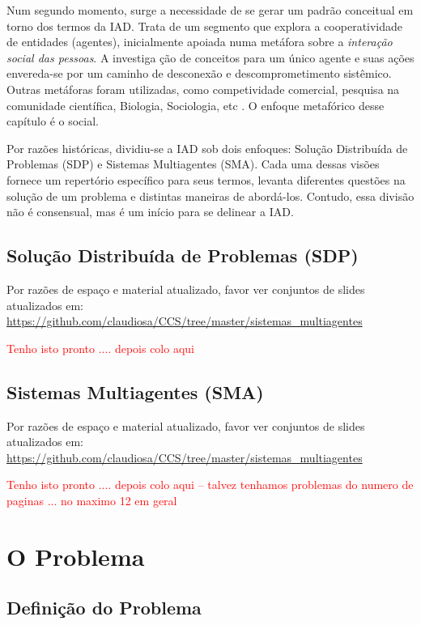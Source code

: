 \documentclass[12pt,final,a4paper]{article}
\theoremstyle{definition}
\begin{document}
Num segundo momento, surge a necessidade de se gerar um padrão
conceitual em torno dos termos da IAD. Trata de um segmento que explora a
cooperatividade de entidades (agentes),  inicialmente apoiada numa
met\'{a}fora sobre a {\em interação social das pessoas}. A investiga%
ção de  conceitos para um \'{u}nico agente e suas ações 
envereda-se por um caminho de desconexão e descomprometimento
sist\^{e}mico. Outras met\'{a}foras foram utilizadas, como 
competividade comercial, pesquisa na comunidade científica, 
Biologia,  Sociologia, etc \cite{pleiad92}. O enfoque metaf\'{o}rico desse
capítulo é o social.

Por razões hist\'{o}ricas, dividiu-se a IAD sob dois enfoques: Solução Distribuída de Problemas (SDP) e Sistemas Multiagentes (SMA). Cada uma dessas visões fornece um repert\'{o}rio específico para
seus termos, levanta diferentes questões na solução de um
problema e distintas maneiras de abord\'{a}-los. Contudo, essa divisão
não é consensual, mas é um início para se delinear a IAD. 


\subsection{Solução Distribuída de Problemas (SDP)}

Por razões de espaço e material atualizado, favor ver conjuntos de slides atualizados em:
\url{https://github.com/claudiosa/CCS/tree/master/sistemas_multiagentes}

\textcolor{red}{Tenho isto pronto .... depois colo aqui}


\subsection{Sistemas Multiagentes (SMA)}


Por razões de espaço e material atualizado, favor ver conjuntos de slides atualizados em:
\url{https://github.com/claudiosa/CCS/tree/master/sistemas_multiagentes}

\textcolor{red}{Tenho isto pronto .... depois colo aqui -- talvez tenhamos problemas do numero de paginas ... no maximo 12 em geral}

\section{O Problema}
\label{sec_problema}

\subsection{Definição do Problema} 
\end{document}
